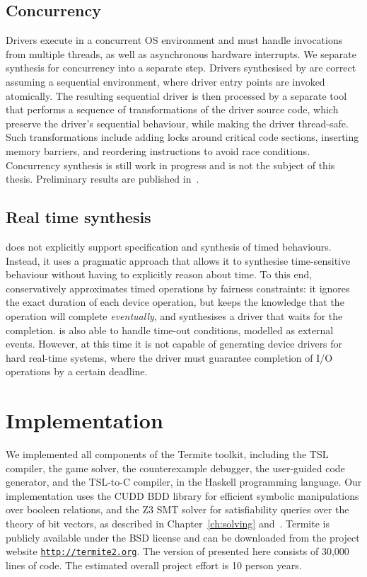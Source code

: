 \subsection{Concurrency}

Drivers execute in a concurrent OS environment and must handle invocations from multiple threads, as well as asynchronous hardware interrupts.  We separate synthesis for concurrency into a separate step.  Drivers synthesised by \termite are correct assuming a sequential environment, where driver entry points are invoked atomically.  The resulting sequential driver is then processed by a separate tool that performs a sequence of transformations of the driver source code, which preserve the driver's sequential behaviour, while making the driver thread-safe.  Such transformations include adding locks around critical code sections, inserting memory barriers, and reordering instructions to avoid race conditions.  Concurrency synthesis is still work in progress and is not the subject of this thesis.  Preliminary results are published in~\cite{Cerny_HRRT_13, Cerny_HRRT_14}.

\subsection{Real time synthesis}

\termite does not explicitly support specification and synthesis of timed behaviours.  Instead, it uses a pragmatic approach that allows it to synthesise time-sensitive behaviour without having to explicitly reason about time.  To this end, \termite conservatively approximates timed operations by fairness constraints: it ignores the exact duration of each device operation, but keeps the knowledge that the operation will complete \emph{eventually}, and synthesises a driver that waits for the completion.  \termite is also able to handle time-out conditions, modelled as external events.  However, at this time it is not capable of generating device drivers for hard real-time systems, where the driver must guarantee completion of I/O operations by a certain deadline.

\section{Implementation}

We implemented all components of the Termite toolkit, including the TSL compiler, the game solver, the counterexample debugger, the user-guided code generator, and the TSL-to-C compiler, in the Haskell programming language.  Our implementation uses the CUDD BDD library for efficient symbolic manipulations over booleen relations, and the Z3 SMT solver for satisfiability queries over the theory of bit vectors, as described in Chapter~\ref{ch:solving} and~\cite{Walker_Ryzhyk_14}.  Termite is publicly available under the BSD license and can be downloaded from the project website \texttt{\url{http://termite2.org}}. The version of \termite presented here consists of 30,000 lines of code.  The estimated overall project effort is 10 person years. 

